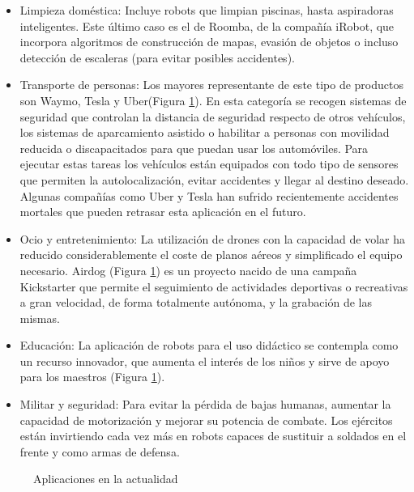 \begin{itemize}
	\item Limpieza doméstica: Incluye robots que limpian piscinas, hasta aspiradoras inteligentes. Este último caso es el de Roomba, de la compañía iRobot, que incorpora algoritmos de construcción de mapas, evasión de objetos o incluso detección de escaleras (para evitar posibles accidentes).
	
	\item Transporte de personas: Los mayores representante de este tipo de productos son Waymo, Tesla y Uber(Figura \ref{FIG:1_Aplicaciones}). En esta categoría se recogen sistemas de seguridad que controlan la distancia de seguridad respecto de otros vehículos, los sistemas de aparcamiento asistido o habilitar a personas con movilidad reducida o discapacitados para que puedan usar los automóviles. Para ejecutar estas tareas los vehículos están equipados con todo tipo de sensores que permiten la autolocalización, evitar accidentes y llegar al destino deseado. Algunas compañías como Uber y Tesla han sufrido recientemente accidentes mortales que pueden retrasar esta aplicación en el futuro.
	
	\item Ocio y entretenimiento: La utilización de drones con la capacidad de volar ha reducido considerablemente el coste de planos aéreos y simplificado el equipo necesario. Airdog (Figura \ref{FIG:1_Aplicaciones}) es un proyecto nacido de una campaña Kickstarter que permite el seguimiento de actividades deportivas o recreativas a gran velocidad, de forma totalmente autónoma, y la grabación de las mismas.
	
	\item Educación: La aplicación de robots para el uso didáctico se contempla como un recurso innovador, que aumenta el interés de los niños y sirve de apoyo para los maestros (Figura \ref{FIG:1_Aplicaciones}).
	
	\item Militar y seguridad: Para evitar la pérdida de bajas humanas, aumentar la capacidad de motorización y mejorar su potencia de combate. Los ejércitos están invirtiendo cada vez más en robots capaces de sustituir a soldados en el frente y como armas de defensa.
	
\end{itemize}

\begin{figure}[hbtp]
	\centering
	\hspace{5mm}
	\hspace{5mm}
	\hspace{5mm}
	\caption{Aplicaciones en la actualidad}
	\label{FIG:1_Aplicaciones}
\end{figure}

